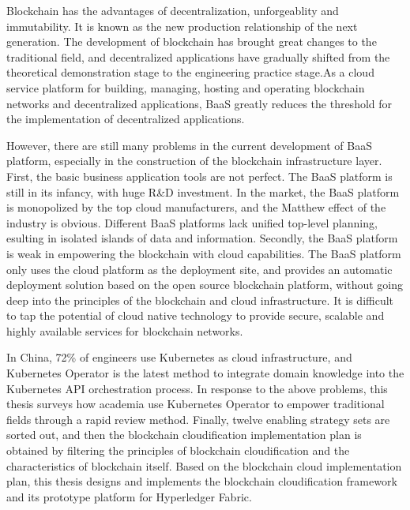 \documentclass[macfonts,master,oneside]{njuthesis}
\begin{document}
\begin{englishabstract}
  Blockchain has the advantages of decentralization, unforgeablity and immutability. It is known as the new production relationship of the next generation. The development of blockchain has brought great changes to the traditional field, and decentralized applications have gradually shifted from the theoretical demonstration stage to the engineering practice stage.As a cloud service platform for building, managing, hosting and operating blockchain networks and decentralized applications, BaaS greatly reduces the threshold for the implementation of decentralized applications.

  However, there are still many problems in the current development of BaaS platform, especially in the construction of the blockchain infrastructure layer. First, the basic business application tools are not perfect. The BaaS platform is still in its infancy, with huge R\&D investment. In the market, the BaaS platform is monopolized by the top cloud manufacturers, and the Matthew effect of the industry is obvious. Different BaaS platforms lack unified top-level planning, esulting in isolated islands of data and information. Secondly, the BaaS platform is weak in empowering the blockchain with cloud capabilities. The BaaS platform only uses the cloud platform as the deployment site, and provides an automatic deployment solution based on the open source blockchain platform, without going deep into the principles of the blockchain and cloud infrastructure. It is difficult to tap the potential of cloud native technology to provide secure, scalable and highly available services for blockchain networks.

  In China, 72\% of engineers use Kubernetes as cloud infrastructure, and Kubernetes Operator is the latest method to integrate domain knowledge into the Kubernetes API orchestration process. In response to the above problems, this thesis surveys how academia use Kubernetes Operator to empower traditional fields through a rapid review method. Finally, twelve enabling strategy sets are sorted out, and then the blockchain cloudification implementation plan is obtained by filtering the principles of blockchain cloudification and the characteristics of blockchain itself. Based on the blockchain cloud implementation plan, this thesis designs and implements the blockchain cloudification framework and its prototype platform for Hyperledger Fabric.


\end{englishabstract}
\end{document}
